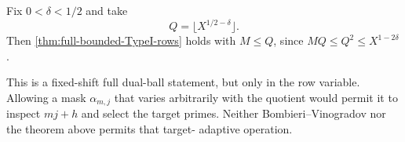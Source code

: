 \begin{corollary}
\label{cor:power-separated-TypeI-calibration}
Fix $0<\delta<1/2$ and take
\begin{equation}
 Q=\lfloor X^{1/2-\delta}\rfloor.
 \label{eq:chosen-Q}
\end{equation}
Then \cref{thm:full-bounded-TypeI-rows} holds with
$M\leq Q$, since $MQ\leq Q^2\leq X^{1-2\delta}$.
\end{corollary}

This is a fixed-shift full dual-ball statement, but only in the row
variable.  Allowing a mask $\alpha_{m,j}$ that varies arbitrarily with the
quotient would permit it to inspect $mj+h$ and select the target primes.
Neither Bombieri--Vinogradov nor the theorem above permits that target-
adaptive operation.
